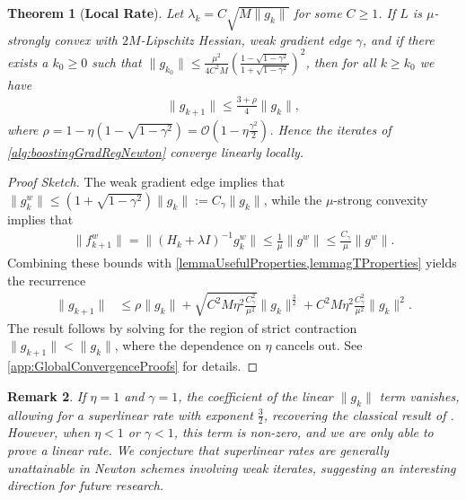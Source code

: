 \documentclass{article}
\theoremstyle{plain}
\newtheorem{theorem}{Theorem}[section]
\newtheorem{remark}[theorem]{Remark} %
\theoremstyle{definition}
\theoremstyle{remark}
\begin{document}
\begin{theorem}[\textbf{Local Rate}]\label{thm:local_rate}
Let $\lambda_k = C\sqrt{M\|g_k\|}$ for some $C\geq 1$. If $L$ is $\mu$-strongly convex with $2M$-Lipschitz Hessian, weak gradient edge $\gamma$, and if there exists a $k_0\geq 0$ such that $\|g_{k_0}\| \leq \frac{\mu^2}{4C^2M}\left( \frac{1-\sqrt{1-\gamma^2}}{1+\sqrt{1-\gamma^2}}\right)^2$, then for all $k\geq k_0$ we have
\vspace{-10pt}
\begin{align}
    \|g_{k+1}\| \leq \frac{3 + \rho}{4} \|g_k\|,
\end{align}
where $\rho = 1 - \eta(1-\sqrt{1-\gamma^2}) = \mathcal{O}(1-\eta\frac{ \gamma^2}{2})$. Hence the iterates of \cref{alg:boostingGradRegNewton} converge linearly locally.
\end{theorem}
\begin{proof}[Proof Sketch]\vspace{-3pt}
    The weak gradient edge implies that $\|g_k^w\| \leq \left( 1 + \sqrt{1-\gamma^2} \right) \|g_k\| := C_\gamma \|g_k\|$, while the $\mu$-strong convexity implies that
    \vspace{-2pt}
    \begin{align*}
        \|f^w_{k+1}\| 
        = \|(H_k+\lambda I)^{-1} g^w_k\|
        \leq \frac{1}{\mu}\|g^w\|
        \leq \frac{C_\gamma}{\mu}\|g^w\|.
    \end{align*}
    \vspace{-2pt}Combining these bounds with \cref{lemmaUsefulProperties,lemmagTProperties} yields the recurrence
    \vspace{-2pt}
    \begin{align*}
        \|g_{k+1}\|
        &\leq \rho \|g_k\| + \sqrt{C^2 M \eta^2 \frac{C_\gamma^2}{\mu^2}} \|g_k\|^\frac{3}{2} + C^2 M \eta^2 \frac{C_\gamma^2}{\mu^2}\|g_k\|^2.
    \end{align*}
    \vspace{-2pt}The result follows by solving for the region of strict contraction $\|g_{k+1}\| < \|g_k\|$, where the dependence on $\eta$ cancels out. See \cref{app:GlobalConvergenceProofs} for details. 
\end{proof}
\begin{remark}
    If $\eta=1$ and $\gamma=1$, the coefficient of the linear $\|g_k\|$ term vanishes, allowing for a superlinear rate with exponent $\frac{3}{2}$, recovering the classical result of \citet{2023RegularizedNewtonMethodWithGlobalConvergence}. However, when $\eta < 1$ or $\gamma < 1$, this term is non-zero, and we are only able to prove a linear rate. We conjecture that superlinear rates are generally unattainable in Newton schemes involving weak iterates, suggesting an interesting direction for future research.
\end{remark}
\end{document}
